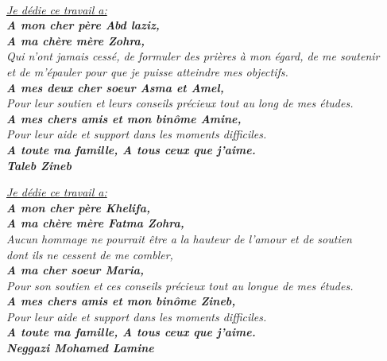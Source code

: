 \documentclass[12pt]{report}
\begin{document}
\begin{center}
    \textit{\fontsize{34}{46}{\bfseries{\color{Blue}{Dédicace}}}}
    \\
    \vspace{0.2in}
    \itshape
    \Large{\underline{Je dédie ce travail a:}}\\          \textbf{\large{A mon cher père Abd laziz,}}\\\vspace{-0.1in}
    \textbf{\large{A ma chère mère Zohra,}}\\
    \large{Qui n'ont jamais cessé, de formuler des prières à mon égard, de me soutenir\\\vspace{-0.1in}et de m'épauler pour que je puisse atteindre mes objectifs.}\\
    \textbf{\large{A mes deux cher soeur Asma et Amel,}}\\
    \large{Pour leur soutien et leurs conseils précieux tout au long de mes études.}\\
    \textbf{\large{A mes chers amis et mon binôme Amine,}}\\
    \large{Pour leur aide et support dans les moments difficiles.}\\
    \textbf{\large{A toute ma famille, A tous ceux que j’aime.}}\\\vspace{0.1in}
    \hfill\textbf{\Large{Taleb Zineb}}

    \vspace{0.2in}
    \itshape
    \Large{\underline{Je dédie ce travail a:}}\\          \textbf{\large{A mon cher père Khelifa,}}\\\vspace{-0.1in}
    \textbf{\large{A ma chère mère Fatma Zohra,}}\\
    \large{Aucun hommage ne pourrait être a la hauteur de l’amour et de soutien\\\vspace{-0.1in}dont ils ne cessent de me combler,}\\
    \textbf{\large{A ma cher soeur Maria,}}\\
    \large{Pour son soutien et ces conseils précieux tout au longue de mes études.}\\
    \textbf{\large{A mes chers amis et mon binôme Zineb,}}\\
    \large{Pour leur aide et support dans les moments difficiles.}\\
    \textbf{\large{A toute ma famille, A tous ceux que j’aime.}}\\\vspace{0.1in}
    \hfill\textbf{\Large{Neggazi Mohamed Lamine}}

\end{center}
\end{document}
